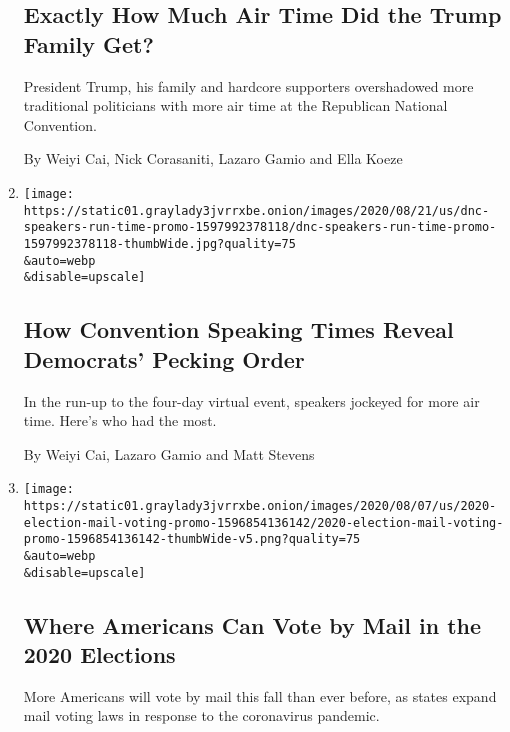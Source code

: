 \begin{enumerate}
  \hypertarget{exactly-how-much-air-time-did-the-trump-family-get}{%
  \subsection{Exactly How Much Air Time Did the Trump Family
  Get?}\label{exactly-how-much-air-time-did-the-trump-family-get}}

  President Trump, his family and hardcore supporters overshadowed more
  traditional politicians with more air time at the Republican National
  Convention.

  By Weiyi Cai, Nick Corasaniti, Lazaro Gamio and Ella Koeze
\item
  \href{/interactive/2020/08/21/us/politics/dnc-speakers-run-time.html}{}

  \texttt{[image: https://static01.graylady3jvrrxbe.onion/images/2020/08/21/us/dnc-speakers-run-time-promo-1597992378118/dnc-speakers-run-time-promo-1597992378118-thumbWide.jpg?quality=75\\\&auto=webp\\\&disable=upscale]}

  \hypertarget{how-convention-speaking-times-reveal-democrats-pecking-order}{%
  \subsection{How Convention Speaking Times Reveal Democrats' Pecking
  Order}\label{how-convention-speaking-times-reveal-democrats-pecking-order}}

  In the run-up to the four-day virtual event, speakers jockeyed for
  more air time. Here's who had the most.

  By Weiyi Cai, Lazaro Gamio and Matt Stevens
\item
  \href{/interactive/2020/08/11/us/politics/vote-by-mail-us-states.html}{}

  \texttt{[image: https://static01.graylady3jvrrxbe.onion/images/2020/08/07/us/2020-election-mail-voting-promo-1596854136142/2020-election-mail-voting-promo-1596854136142-thumbWide-v5.png?quality=75\\\&auto=webp\\\&disable=upscale]}

  \hypertarget{where-americans-can-vote-by-mail-in-the-2020-elections}{%
  \subsection{Where Americans Can Vote by Mail in the 2020
  Elections}\label{where-americans-can-vote-by-mail-in-the-2020-elections}}

  More Americans will vote by mail this fall than ever before, as states
  expand mail voting laws in response to the coronavirus pandemic.


\end{enumerate}
